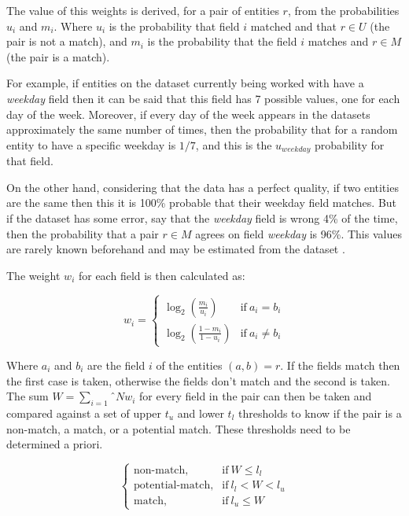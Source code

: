 \documentclass[epsfig,a4paper,11pt,titlepage,twoside,openany]{book}
\begin{document}
The value of this weights is derived, for a pair of entities $r$, from the probabilities $u_i$ and $m_i$. Where $u_i$ is the probability that field $i$ matched and that $r \in U$ (the pair is not a match), and $m_i$ is the probability that the field $i$ matches and $r \in M$ (the pair is a match).

For example, if entities on the dataset currently being worked with have a \textit{weekday} field then it can be said that this field has 7 possible values, one for each day of the week. Moreover, if every day of the week appears in the datasets approximately the same number of times, then the probability that for a random entity to have a specific weekday is $1/7$, and this is the $u_{weekday}$ probability for that field.

On the other hand, considering that the data has a perfect quality, if two entities are the same then this it is 100\% probable that their weekday field matches. But if the dataset has some error, say that the \textit{weekday} field is wrong 4\% of the time, then the probability that a pair $r \in M$ agrees on field \textit{weekday} is 96\%. This values are rarely known beforehand and may be estimated from the dataset \cite{christen12_data}.

The weight $w_i$ for each field is then calculated as:

\begin{equation*}
  w_i = \begin{cases}
    \log_2(\frac{m_i}{u_i}) & \text{if}\ a_i = b_i \\
    \log_2(\frac{1- m_i}{1-u_i}) & \text{if}\ a_i \neq b_i 
    \end{cases}
\end{equation*}

Where $a_i$ and $b_i$ are the field $i$ of the entities $(a,b) = r$. If the fields match then the first case is taken, otherwise the fields don't match and the second is taken. The sum $W = \sum_{i=1}ˆN w_i$ for every field in the pair can then be taken and compared against a set of upper $t_u$ and lower $t_l$ thresholds to know if the pair is a non-match, a match, or a potential match. These thresholds need to be determined a priori.

\begin{equation*}
  \begin{cases}
    \text{non-match}, & \text{if}\ W \leq l_l \\
    \text{potential-match}, & \text{if}\ l_l < W < l_u \\
    \text{match}, & \text{if}\ l_u \leq W 
  \end{cases}
\end{equation*}
\end{document}
